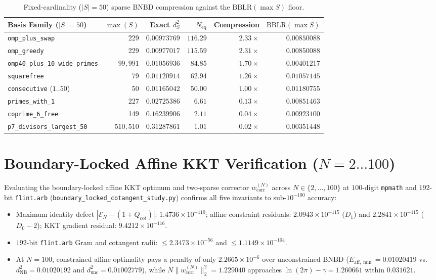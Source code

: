 \documentclass[11pt,a4paper]{article}
\theoremstyle{definition}
\begin{document}
\begin{table}[h!]
\centering
\small
\begin{tabular}{@{}lrrrrr@{}}
\toprule
\textbf{Basis Family ($|S|=50$)} & $\max(S)$ & \textbf{Exact} $d_S^2$ & $N_{\mathrm{eq}}$ & \textbf{Compression} & $\mathrm{BBLR}(\max S)$ \\
\midrule
\texttt{omp\_plus\_swap} & 229 & $0.00973769$ & $116.29$ & $2.33\times$ & $0.00850088$ \\
\texttt{omp\_greedy} & 229 & $0.00977017$ & $115.59$ & $2.31\times$ & $0.00850088$ \\
\texttt{omp40\_plus\_10\_wide\_primes} & $99{,}991$ & $0.01056936$ & $84.85$ & $1.70\times$ & $0.00401217$ \\
\texttt{squarefree} & 79 & $0.01120914$ & $62.94$ & $1.26\times$ & $0.01057145$ \\
\texttt{consecutive} ($1..50$) & 50 & $0.01165042$ & $50.00$ & $1.00\times$ & $0.01180755$ \\
\texttt{primes\_with\_1} & 227 & $0.02725386$ & $6.61$ & $0.13\times$ & $0.00851463$ \\
\texttt{coprime\_6\_free} & 149 & $0.16239906$ & $2.11$ & $0.04\times$ & $0.00923100$ \\
\texttt{p7\_divisors\_largest\_50} & $510{,}510$ & $0.31287861$ & $1.01$ & $0.02\times$ & $0.00351448$ \\
\bottomrule
\end{tabular}
\caption{Fixed-cardinality ($|S| = 50$) sparse BNBD compression against the $\mathrm{BBLR}(\max S)$ floor.}
\label{tab:sparse_bnbd}
\end{table}

\section{Boundary-Locked Affine KKT Verification ($N = 2 \dots 100$)}\label{sec:boundary_kkt}

Evaluating the boundary-locked affine KKT optimum and two-sparse corrector $w_{\mathrm{corr}}^{(N)}$ across $N \in \{2, \dots, 100\}$ at $100$-digit \texttt{mpmath} and $192$-bit \texttt{flint.arb} (\texttt{boundary\_\allowbreak locked\_\allowbreak cotangent\_\allowbreak study.py}) confirms all five invariants to sub-$10^{-100}$ accuracy:
\begin{itemize}[noitemsep]
  \item Maximum identity defect $|\mathcal{E}_N - (1 + Q_{\mathrm{cot}})|$: $1.4736 \times 10^{-110}$; affine constraint residuals: $2.0943 \times 10^{-115}$ ($D_1$) and $2.2841 \times 10^{-115}$ ($D_0 - 2$); KKT gradient residual: $9.4212 \times 10^{-116}$.
  \item $192$-bit \texttt{flint.arb} Gram and cotangent radii: $\le 2.3473 \times 10^{-56}$ and $\le 1.1149 \times 10^{-104}$.
  \item At $N = 100$, constrained affine optimality pays a penalty of only $2.2665 \times 10^{-6}$ over unconstrained BNBD ($E_{\mathrm{aff},\min} = 0.01020419$ vs.\ $d_{\mathrm{NB}}^2 = 0.01020192$ and $d_{\mathrm{unc}}^2 = 0.01002779$), while $N\|w_{\mathrm{corr}}^{(N)}\|_2^2 = 1.229040$ approaches $\ln(2\pi) - \gamma = 1.260661$ within $0.031621$.
\end{itemize}
\end{document}
